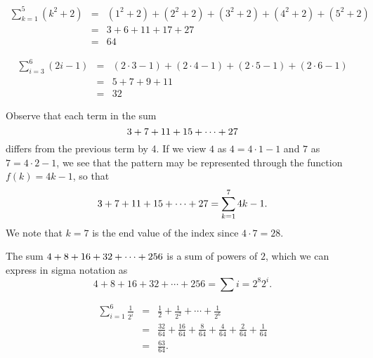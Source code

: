\begin{activitySolution}
\ba
	\item 
	\begin{eqnarray*}
	 \sum_{k=1}^{5} (k^2 + 2) & = & (1^2 + 2) + (2^2 + 2) + (3^2 + 2) + (4^2 + 2) + (5^2 + 2) \\
	 					& = & 3 + 6 + 11 + 17 + 27 \\
						& = & 64
	\end{eqnarray*}
	\item 
	\begin{eqnarray*}
	 \sum_{i=3}^{6} (2i-1) & = & (2 \cdot 3 - 1) + (2 \cdot 4- 1) + (2 \cdot 5 - 1) + (2 \cdot 6 - 1) \\
	 				& = & 5 + 7 + 9 + 11 \\
					& = & 32
	\end{eqnarray*}
	\item Observe that each term in the sum
	$$\displaystyle 3 + 7 + 11 + 15 +  \cdots + 27$$
	differs from the previous term by 4.  If we view $4$ as $4 = 4 \cdot 1 - 1$ and $7$ as $7 = 4 \cdot 2 - 1$, we see that the pattern may be represented through the function $f(k) = 4k-1$, so that
	$$\displaystyle 3 + 7 + 11 + 15 +  \cdots + 27 = \sum_{k=1}^{7} 4k-1.$$
	We note that $k=7$ is the end value of the index since $4 \cdot 7  = 28$.
	\item The sum $\displaystyle 4 + 8 + 16 + 32 + \cdots + 256$ is a sum of powers of $2$, which we can express in sigma notation as
	$$4 + 8 + 16 + 32 + \cdots + 256 = \sum{i=2}^{8} 2^i.$$
	\item
	\begin{eqnarray*}
	  \sum_{i=1}^{6} \frac{1}{2^i} & = & \frac{1}{2} + \frac{1}{2^2} + \cdots + \frac{1}{2^6} \\
	  					& = & \frac{32}{64} + \frac{16}{64} + \frac{8}{64} + \frac{4}{64} + \frac{2}{64} + \frac{1}{64} \\
						& = & \frac{63}{64}.
	\end{eqnarray*}
\ea
\end{activitySolution}
\aftera